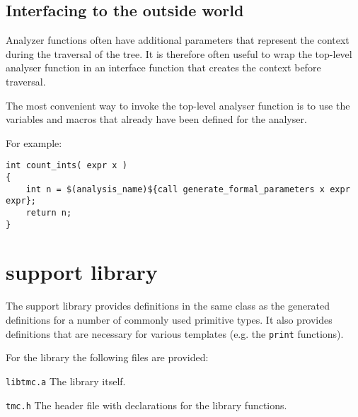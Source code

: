 \subsection{Interfacing to the outside world}
Analyzer functions often have additional parameters that represent
the context during the traversal of the tree. It is therefore often
useful to wrap the top-level analyser function in an interface function
that creates the context before traversal.
\par
The most convenient way to invoke the top-level analyser function is to
use the variables and macros that already have been defined for the analyser.
\par
For example:
\begin{verbatim}
int count_ints( expr x )
{
    int n = $(analysis_name)${call generate_formal_parameters x expr expr};
    return n;
}
\end{verbatim}
\section{{\C} support library}
\label{s.csupportlib}
The {\C} support library provides definitions in
the same class as the generated definitions for a number of commonly used
primitive types.
It also provides definitions that are necessary
for various templates (e.g. the \texttt{print} functions).
\par
For the library the following files are provided:

\begin{desctab}
\item[\texttt{libtmc.a}] The library itself.
\item[\texttt{tmc.h}] The header file with declarations for the library functions. \\
\end{desctab}
